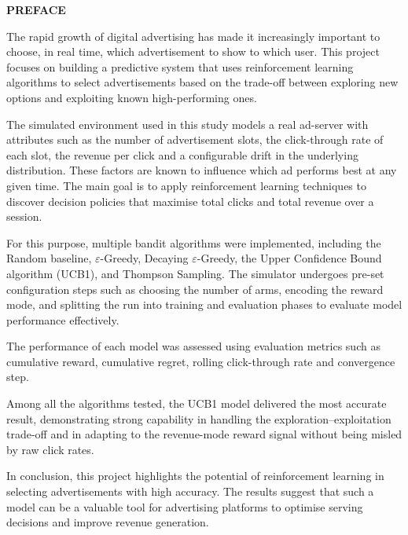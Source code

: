 \begin{center}{\Large\bfseries PREFACE}\end{center}
\vspace{1em}

The rapid growth of digital advertising has made it increasingly important to choose, in real time, which advertisement to show to which user. This project focuses on building a predictive system that uses reinforcement learning algorithms to select advertisements based on the trade-off between exploring new options and exploiting known high-performing ones.

The simulated environment used in this study models a real ad-server with attributes such as the number of advertisement slots, the click-through rate of each slot, the revenue per click and a configurable drift in the underlying distribution. These factors are known to influence which ad performs best at any given time. The main goal is to apply reinforcement learning techniques to discover decision policies that maximise total clicks and total revenue over a session.

For this purpose, multiple bandit algorithms were implemented, including the Random baseline, $\varepsilon$-Greedy, Decaying $\varepsilon$-Greedy, the Upper Confidence Bound algorithm (UCB1), and Thompson Sampling. The simulator undergoes pre-set configuration steps such as choosing the number of arms, encoding the reward mode, and splitting the run into training and evaluation phases to evaluate model performance effectively.

The performance of each model was assessed using evaluation metrics such as cumulative reward, cumulative regret, rolling click-through rate and convergence step.

Among all the algorithms tested, the UCB1 model delivered the most accurate result, demonstrating strong capability in handling the exploration--exploitation trade-off and in adapting to the revenue-mode reward signal without being misled by raw click rates.

In conclusion, this project highlights the potential of reinforcement learning in selecting advertisements with high accuracy. The results suggest that such a model can be a valuable tool for advertising platforms to optimise serving decisions and improve revenue generation.
\newpage
